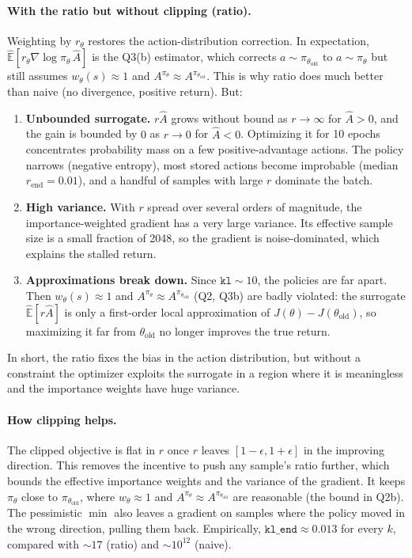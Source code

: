 \documentclass[11pt]{article}
\newcommand{\piold}{\pi_{\theta_{\mathrm{old}}}}
\newcommand{\Ahat}{\hat{A}}
\newcommand{\Ehat}{\hat{\mathbb{E}}}
\newcommand{\code}[1]{\texttt{#1}}
\begin{document}
\paragraph{With the ratio but without clipping (ratio).}
Weighting by $r_\theta$ restores the action-distribution correction. In expectation,
$\Ehat[r_\theta\nabla\log\pi_\theta\,\Ahat]$ is the Q3(b) estimator, which corrects $a\sim\piold$ to
$a\sim\pi_\theta$ but still assumes $w_\theta(s)\approx1$ and $A^{\pi_\theta}\approx A^{\piold}$.
This is why ratio does much better than naive (no divergence, positive return). But:
\begin{enumerate}[nosep,leftmargin=*]
  \item \textbf{Unbounded surrogate.} $r\Ahat$ grows without bound as $r\to\infty$ for $\Ahat>0$, and the gain is bounded by
        $0$ as $r\to0$ for $\Ahat<0$. Optimizing it for 10 epochs concentrates probability mass on a few
        positive-advantage actions. The policy narrows (negative entropy), most stored actions become improbable
        (median $r_{\text{end}}=0.01$), and a handful of samples with large $r$ dominate the batch.
  \item \textbf{High variance.} With $r$ spread over several orders of magnitude, the importance-weighted
        gradient has a very large variance. Its effective sample size is a small fraction of 2048, so the gradient is
        noise-dominated, which explains the stalled return.
  \item \textbf{Approximations break down.} Since $\code{kl}\sim10$, the policies are far apart. Then
        $w_\theta(s)\approx1$ and $A^{\pi_\theta}\approx A^{\piold}$ (Q2, Q3b) are badly violated: the surrogate
        $\Ehat[r\Ahat]$ is only a first-order local approximation of $J(\theta)-J(\theta_{\mathrm{old}})$, so maximizing it
        far from $\theta_{\mathrm{old}}$ no longer improves the true return.
\end{enumerate}
In short, the ratio fixes the bias in the action distribution, but without a constraint the optimizer
exploits the surrogate in a region where it is meaningless and the importance weights have huge variance.

\paragraph{How clipping helps.}
The clipped objective is flat in $r$ once $r$ leaves $[1-\epsilon,1+\epsilon]$ in the improving
direction. This removes the incentive to push any sample's ratio further, which bounds the effective
importance weights and the variance of the gradient. It keeps $\pi_\theta$ close to $\piold$, where
$w_\theta\approx1$ and $A^{\pi_\theta}\approx A^{\piold}$ are reasonable (the bound in Q2b). The pessimistic $\min$
also leaves a gradient on samples where the policy moved in the wrong direction, pulling them back.
Empirically, $\code{kl\_end}\approx0.013$ for every $k$, compared with $\sim17$ (ratio) and $\sim10^{12}$ (naive).
\end{document}
